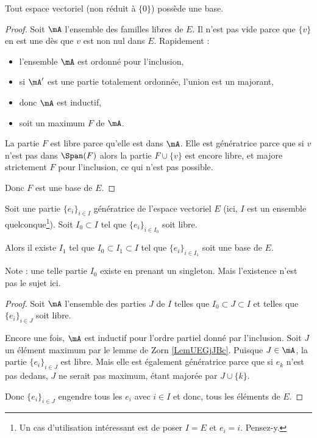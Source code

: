 \begin{proposition}        \label{PROPooHDCEooMhDjPi}
	Tout espace vectoriel (non réduit à \( \{ 0 \}\)) possède une base.
\end{proposition}

\begin{proof}
	Soit \( \mA\) l'ensemble des familles libres de \( E\). Il n'est pas vide parce que \( \{ v \}\) en est une dès que \( v\) est non nul dans \( E\). Rapidement :
	\begin{itemize}
		\item l'ensemble \( \mA\) est ordonné pour l'inclusion,
		\item si \( \mA'\) est une partie totalement ordonnée, l'union est un majorant,
		\item donc \( \mA\) est inductif,
		\item soit un maximum \( F\) de \( \mA\).
	\end{itemize}
	La partie \( F\) est libre parce qu'elle est dans \( \mA\). Elle est génératrice parce que si \( v\) n'est pas dans \( \Span(F)\) alors la partie \( F\cup\{ v \}\) est encore libre, et majore strictement \( F\) pour l'inclusion, ce qui n'est pas possible.

	Donc \( F\) est une base de \( E\).
\end{proof}

\begin{theorem}      \label{THOooOQLQooHqEeDK}
	Soit une partie \( \{ e_i \}_{i\in I}\) génératrice de l'espace vectoriel \( E\) (ici, \( I\) est un ensemble quelconque\footnote{Un cas d'utilisation intéressant est de poser \( I=E\) et \( e_i=i\). Pensez-y.}). Soit \( I_0\subset I\) tel que \( \{ e_i \}_{i\in I_0}\) soit libre.

	Alors il existe \( I_1\) tel que \( I_0\subset I_1\subset I\) tel que \( \{ e_i \}_{i\in I_1}\) soit une base de \( E\).
\end{theorem}

Note : une telle partie \( I_0\) existe en prenant un singleton. Mais l'existence n'est pas le sujet ici.

\begin{proof}
	Soit \( \mA\) l'ensemble des parties \( J\) de \( I\) telles que \( I_0\subset J\subset I\) et telles que \( \{ e_i \}_{i\in J}\) soit libre.

	Encore une fois, \( \mA\) est inductif pour l'ordre partiel donné par l'inclusion. Soit \( J\) un élément maximum par le lemme de Zorn \ref{LemUEGjJBc}. Puisque \( J\in\mA\), la partie \( \{ e_i \}_{i\in J}\) est libre. Mais elle est également génératrice parce que si \( e_k\) n'est pas dedans, \( J\) ne serait pas maximum, étant majorée par \( J\cup\{ k \}\).

	Donc \( \{ e_i \}_{i\in J}\) engendre tous les \( e_i\) avec \( i\in I\) et donc, tous les éléments de \( E\).
\end{proof}

